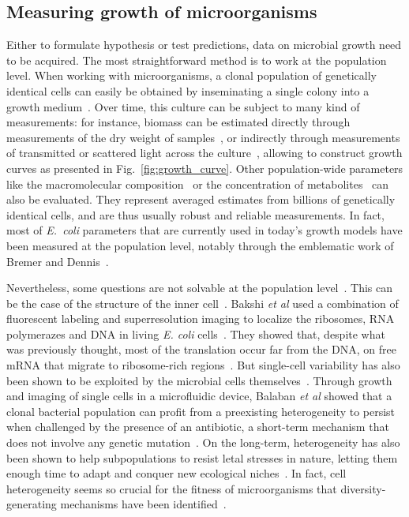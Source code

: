 \subsection{Measuring growth of microorganisms}

Either to formulate hypothesis or test predictions, data on microbial growth need to be acquired.
The most straightforward method is to work at the population level.
When working with microorganisms, a clonal population of genetically identical cells can easily be obtained by inseminating a single colony into a growth medium~\cite{schaechter_microbe_2006}.
Over time, this culture can be subject to many kind of measurements: for instance, biomass can be estimated  directly through measurements of the dry weight of samples~\cite{monod_growth_1949}, or indirectly through measurements of transmitted or scattered light across the culture~\cite{volkmer_condition-dependent_2011}, allowing to construct growth curves as presented in Fig.~\ref{fig:growth_curve}.
Other population-wide parameters like the macromolecular composition~\cite{scott_interdependence_2010,scott_bacterial_2011} or the concentration of metabolites~\cite{bennett_absolute_2009} can also be evaluated.
They represent averaged estimates from billions of genetically identical cells, and are thus usually robust and reliable measurements.
In fact, most of \textit{E.~coli} parameters that are currently used in today's growth models have been measured at the population level, notably through the emblematic work of Bremer and Dennis~\cite{churchward_macromolecular_1982,bremer_modulation_1996,bremer_free_2003,bremer_feedback_2008}.

Nevertheless, some questions are not solvable at the population level~\cite{davey_flow_1996,bakshi_superresolution_2012,balaban_bacterial_2004}.
This can be the case of the structure of the inner cell~\cite{bakshi_superresolution_2012}.
Bakshi \textit{et al} used a combination of fluorescent labeling and superresolution imaging to localize the ribosomes, RNA polymerazes and DNA in living \textit{E. coli} cells~\cite{bakshi_superresolution_2012}.
They showed that, despite what was previously thought, most of the translation occur far from the DNA, on free mRNA that migrate to ribosome-rich regions~\cite{bakshi_superresolution_2012}.
But single-cell variability has also been shown to be exploited by the microbial cells themselves~\cite{balaban_bacterial_2004,booth_stress_2002,sumner_phenotypic_2002}.
Through growth and imaging of single cells in a microfluidic device, Balaban \textit{et al} showed that a clonal bacterial population can profit from a preexisting heterogeneity to persist when challenged by the presence of an antibiotic, a short-term mechanism that does not involve any genetic mutation~\cite{balaban_bacterial_2004}.
On the long-term, heterogeneity has also been shown to help subpopulations to resist letal stresses in nature, letting them enough time to adapt and conquer new ecological niches~\cite{booth_stress_2002,sumner_phenotypic_2002}.
In fact, cell heterogeneity seems so crucial for the fitness of microorganisms that diversity-generating mechanisms have been identified~\cite{true_yeast_2000,fraser_noise_2004,raser_control_2004}.

